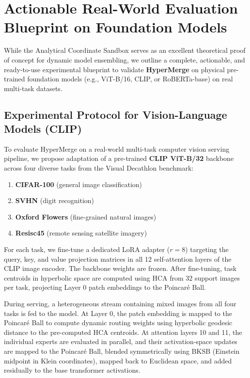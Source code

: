 \documentclass{article}
\theoremstyle{plain}
\theoremstyle{definition}
\theoremstyle{remark}
\begin{document}
\section{Actionable Real-World Evaluation Blueprint on Foundation Models}
\label{app:realworld}

While the Analytical Coordinate Sandbox serves as an excellent theoretical proof of concept for dynamic model ensembling, we outline a complete, actionable, and ready-to-use experimental blueprint to validate \textbf{HyperMerge} on physical pre-trained foundation models (e.g., ViT-B/16, CLIP, or RoBERTa-base) on real multi-task datasets.

\subsection{Experimental Protocol for Vision-Language Models (CLIP)}
To evaluate HyperMerge on a real-world multi-task computer vision serving pipeline, we propose adaptation of a pre-trained \textbf{CLIP ViT-B/32} backbone across four diverse tasks from the Visual Decathlon benchmark:
\begin{enumerate}
    \item \textbf{CIFAR-100} (general image classification)
    \item \textbf{SVHN} (digit recognition)
    \item \textbf{Oxford Flowers} (fine-grained natural images)
    \item \textbf{Resisc45} (remote sensing satellite imagery)
\end{enumerate}

For each task, we fine-tune a dedicated LoRA adapter ($r=8$) targeting the query, key, and value projection matrices in all 12 self-attention layers of the CLIP image encoder. The backbone weights are frozen. After fine-tuning, task centroids in hyperbolic space are computed using HCA from 32 support images per task, projecting Layer 0 patch embeddings to the Poincaré Ball.

During serving, a heterogeneous stream containing mixed images from all four tasks is fed to the model. At Layer 0, the patch embedding is mapped to the Poincaré Ball to compute dynamic routing weights using hyperbolic geodesic distance to the pre-computed HCA centroids. At attention layers 10 and 11, the individual experts are evaluated in parallel, and their activation-space updates are mapped to the Poincaré Ball, blended symmetrically using BKSB (Einstein midpoint in Klein coordinates), mapped back to Euclidean space, and added residually to the base transformer activations.
\end{document}
